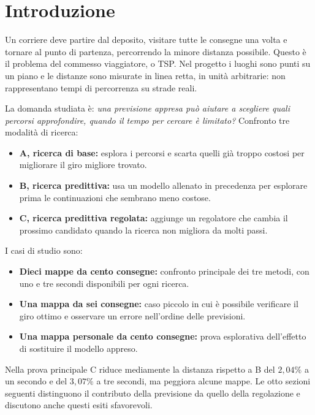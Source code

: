 \section*{Introduzione}
Un corriere deve partire dal deposito, visitare tutte le consegne una volta
e tornare al punto di partenza, percorrendo la minore distanza possibile.
Questo è il problema del commesso viaggiatore, o TSP. Nel progetto i luoghi
sono punti su un piano e le distanze sono misurate in linea retta, in unità
arbitrarie: non rappresentano tempi di percorrenza su strade reali.

La domanda studiata è: \emph{una previsione appresa può aiutare a scegliere
quali percorsi approfondire, quando il tempo per cercare è limitato?}
Confronto tre modalità di ricerca:
\begin{itemize}
\item \textbf{A, ricerca di base:} esplora i percorsi e scarta quelli già
  troppo costosi per migliorare il giro migliore trovato.
\item \textbf{B, ricerca predittiva:} usa un modello allenato in precedenza
  per esplorare prima le continuazioni che sembrano meno costose.
\item \textbf{C, ricerca predittiva regolata:} aggiunge un regolatore che
  cambia il prossimo candidato quando la ricerca non migliora da molti passi.
\end{itemize}

I casi di studio sono:
\begin{itemize}
\item \textbf{Dieci mappe da cento consegne:} confronto principale dei tre
  metodi, con uno e tre secondi disponibili per ogni ricerca.
\item \textbf{Una mappa da sei consegne:} caso piccolo in cui è possibile
  verificare il giro ottimo e osservare un errore nell'ordine delle previsioni.
\item \textbf{Una mappa personale da cento consegne:} prova esplorativa
  dell'effetto di sostituire il modello appreso.
\end{itemize}

Nella prova principale C riduce mediamente la distanza rispetto a B del
$2{,}04\%$ a un secondo e del $3{,}07\%$ a tre secondi, ma peggiora alcune
mappe. Le otto sezioni seguenti distinguono il contributo della previsione
da quello della regolazione e discutono anche questi esiti sfavorevoli.
